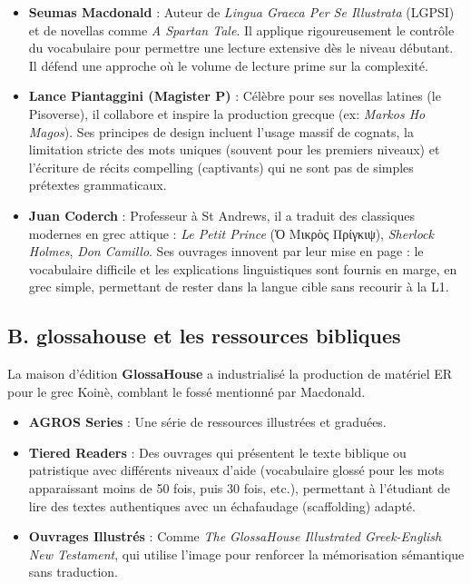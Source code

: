 \begin{itemize}\item \textbf{Seumas Macdonald} : Auteur de \textit{Lingua Graeca Per Se Illustrata} (LGPSI) et de novellas comme \textit{A Spartan Tale}. Il applique rigoureusement le contrôle du vocabulaire pour permettre une lecture extensive dès le niveau débutant. Il défend une approche où le volume de lecture prime sur la complexité.\cite{III-3-2-ref33}\item \textbf{Lance Piantaggini (Magister P)} : Célèbre pour ses novellas latines (le \og Pisoverse\fg{}), il collabore et inspire la production grecque (ex: \textit{Markos Ho Magos}). Ses principes de design incluent l'usage massif de cognats, la limitation stricte des mots uniques (souvent  pour les premiers niveaux) et l'écriture de récits \og compelling\fg{} (captivants) qui ne sont pas de simples prétextes grammaticaux.\cite{III-3-2-ref35}\item \textbf{Juan Coderch} : Professeur à St Andrews, il a traduit des classiques modernes en grec attique : \textit{Le Petit Prince} (Ὁ Μικρὸς Πρίγκιψ), \textit{Sherlock Holmes}, \textit{Don Camillo}. Ses ouvrages innovent par leur mise en page : le vocabulaire difficile et les explications linguistiques sont fournis en marge, en grec simple, permettant de rester dans la langue cible sans recourir à la L1.\cite{III-3-2-ref33}\end{itemize}

\subsection{B. glossahouse et les ressources bibliques}

La maison d'édition \textbf{GlossaHouse} a industrialisé la production de matériel ER pour le grec
Koinè, comblant le fossé mentionné par Macdonald.

\begin{itemize}\item \textbf{AGROS Series} : Une série de ressources illustrées et graduées.\item \textbf{Tiered Readers} : Des ouvrages qui présentent le texte biblique ou patristique avec différents niveaux d'aide (vocabulaire glossé pour les mots apparaissant moins de 50 fois, puis 30 fois, etc.), permettant à l'étudiant de lire des textes authentiques avec un \og échafaudage\fg{} (scaffolding) adapté.\cite{III-3-2-ref39}\item \textbf{Ouvrages Illustrés} : Comme \textit{The GlossaHouse Illustrated Greek-English New Testament}, qui utilise l'image pour renforcer la mémorisation sémantique sans traduction.\cite{III-3-2-ref41}\end{itemize}

